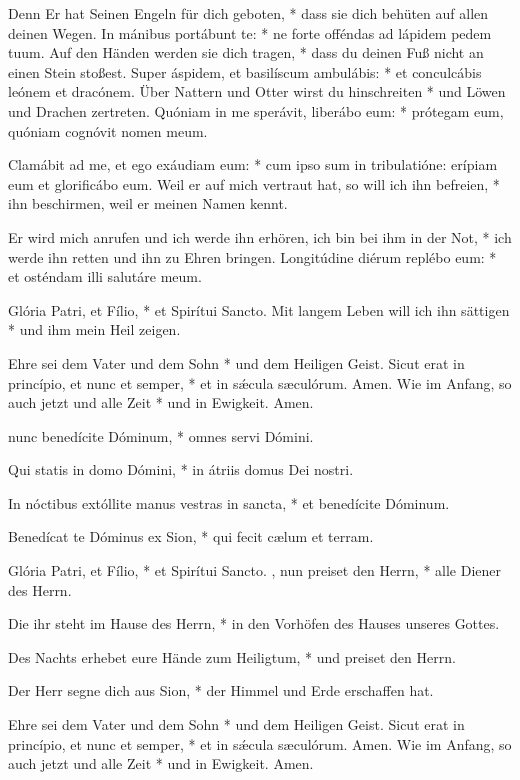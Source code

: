 \documentclass[fontsize=10pt,paper=A5,twoside,BCOR=1mm,DIV=21,headinclude]{scrarticle}
\begin{document}
\begin{paracol}{2}
\begin{psalmus}
	Denn Er hat Seinen Engeln für dich geboten, * dass sie dich behüten auf allen deinen Wegen.
\switchcolumn*
In mánibus portábunt te: * ne forte offéndas ad lápidem pedem tuum.
	\switchcolumn
	Auf den Händen werden sie dich tragen, * dass du deinen Fuß nicht an einen Stein stoßest.
\switchcolumn*
Super áspidem, et basilíscum ambulábis: * et conculcábis leónem et dracónem.
	\switchcolumn
	Über Nattern und Otter wirst du hinschreiten * und Löwen und Drachen zertreten.
\switchcolumn*
Quóniam in me sperávit, liberábo  eum: * prótegam eum, quóniam cognóvit nomen meum.

Clamábit ad me, et ego exáudiam eum: * cum ipso sum in tribulatióne: erípiam eum et glorificábo eum.
	\switchcolumn
	Weil er auf mich vertraut hat, so will ich ihn befreien, * ihn beschirmen, weil er meinen Namen kennt.

	Er wird mich anrufen und ich werde ihn erhören, ich bin bei ihm in der Not, * ich werde ihn retten und ihn zu Ehren bringen.
\switchcolumn*
Longitúdine diérum replébo eum: * et osténdam illi salutáre meum.

Glória Patri, et Fílio, * et Spirítui Sancto.
	\switchcolumn
	Mit langem Leben will ich ihn sättigen * und ihm mein Heil zeigen.

	Ehre sei dem Vater und dem Sohn * und dem Heiligen Geist.
\switchcolumn*
Sicut erat in princípio, et nunc et semper, * et in s\'æcula sæculórum. Amen.
	\switchcolumn
	Wie im Anfang, so auch jetzt und alle Zeit * und in Ewigkeit. Amen.
\end{psalmus}
\end{paracol}


\vspace{.3em}

\begin{paracol}{2} \pcb
\begin{psalmus}
 nunc benedícite Dóminum, * omnes servi Dómini.

Qui statis in domo Dómini, * in átriis domus Dei nostri.

In nóctibus extóllite manus vestras in sancta, * et benedícite Dóminum.

Benedícat te Dóminus ex Sion, * qui fecit cælum et terram.

Glória Patri, et Fílio, * et Spirítui Sancto.
	\switchcolumn
	, nun preiset den Herrn, * alle Diener des Herrn.

	Die ihr steht im Hause des Herrn, * in den Vorhöfen des Hauses unseres Gottes.

	Des Nachts erhebet eure Hände zum Heiligtum, * und preiset den Herrn.

	Der Herr segne dich aus Sion, * der Himmel und Erde erschaffen hat.

	Ehre sei dem Vater und dem Sohn * und dem Heiligen Geist.
\switchcolumn*
Sicut erat in princípio, et nunc et semper, * et in s\'æcula sæculórum. Amen.
	\switchcolumn
	Wie im Anfang, so auch jetzt und alle Zeit * und in Ewigkeit. Amen.
\end{psalmus}
\end{paracol}
\end{document}
